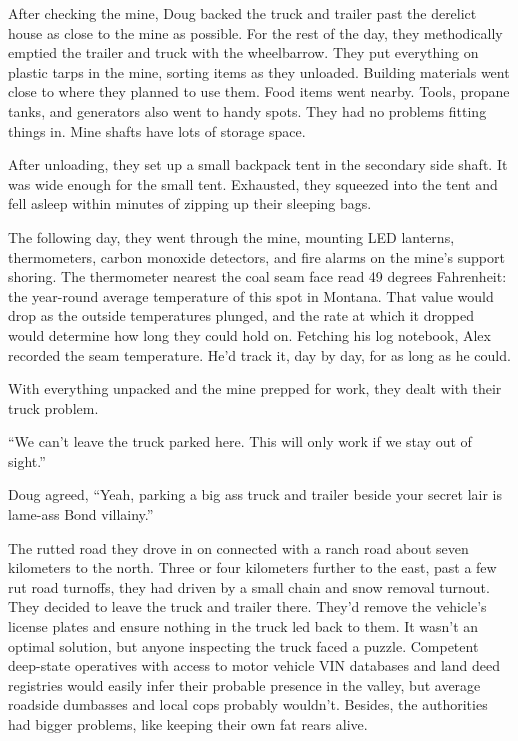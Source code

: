 After checking the mine, Doug backed the truck and trailer past the
derelict house as close to the mine as possible. For the rest of the
day, they methodically emptied the trailer and truck with the
wheelbarrow. They put everything on plastic tarps in the mine, sorting
items as they unloaded. Building materials went close to where they
planned to use them. Food items went nearby. Tools, propane tanks, and
generators also went to handy spots. They had no problems fitting things
in. Mine shafts have lots of storage space.

After unloading, they set up a small backpack tent in the secondary side
shaft. It was wide enough for the small tent. Exhausted, they squeezed
into the tent and fell asleep within minutes of zipping up their
sleeping bags.

The following day, they went through the mine, mounting LED lanterns,
thermometers, carbon monoxide detectors, and fire alarms on the mine's
support shoring. The thermometer nearest the coal seam face read 49
degrees Fahrenheit: the year-round average temperature of this spot in
Montana. That value would drop as the outside temperatures plunged, and
the rate at which it dropped would determine how long they could hold
on. Fetching his log notebook, Alex recorded the seam temperature. He'd
track it, day by day, for as long as he could.

With everything unpacked and the mine prepped for work, they dealt with
their truck problem.

``We can't leave the truck parked here. This will only work if we stay
out of sight.''

Doug agreed, ``Yeah, parking a big ass truck and trailer beside your
secret lair is lame-ass Bond villainy.''

The rutted road they drove in on connected with a ranch road about seven
kilometers to the north. Three or four kilometers further to the east,
past a few rut road turnoffs, they had driven by a small chain and snow
removal turnout. They decided to leave the truck and trailer there.
They'd remove the vehicle's license plates and ensure nothing in the
truck led back to them. It wasn't an optimal solution, but anyone
inspecting the truck faced a puzzle. Competent deep-state operatives
with access to motor vehicle VIN databases and land deed registries
would easily infer their probable presence in the valley, but average
roadside dumbasses and local cops probably wouldn't. Besides, the
authorities had bigger problems, like keeping their own fat rears alive.

